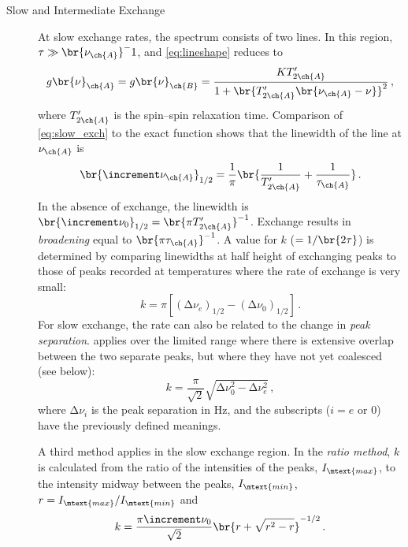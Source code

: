 \begin{description}
	\item[Slow and Intermediate Exchange] 
At slow exchange rates, the spectrum consists of two lines. 
In this region, \( \tau \gg \br{\nu_{\ch{A}}}^-1 \), and \cref{eq:lineshape} reduces to 
\begin{equation}
  g\br{\nu}_{\ch{A}} = g\br{\nu}_{\ch{B}} = \frac{K T'_{2\ch{A}}}{1 + \br{T'_{2\ch{A}} \br{\nu_{\ch{A}} - \nu}}^2} \, ,
  \label{eq:slow_exch_peak}
\end{equation}
where \( T'_{2\ch{A}} \) is the spin--spin relaxation time. 
Comparison of \cref{eq:slow_exch} to the exact function shows that the linewidth of the line at \( \nu_{\ch{A}} \) is
\begin{equation}
  \br{\increment \nu_{\ch{A}}}_{1/2} = \frac{1}{\pi} \br{\frac{1}{T'_{2\ch{A}}} + \frac{1}{\tau_{\ch{A}}}} \, .
  \label{eq:slow_exch_width}
\end{equation}
In the absence of exchange, the linewidth is \( \br{\increment \nu_0}_{1/2} = \br{\pi T'_{2\ch{A}}}^{-1} \). 
Exchange results in \emph{broadening} equal to \( \br{\pi \tau_{\ch{A}}}^{-1} \). 
A value for \( k \) (\( =1/\br{2\tau} \)) is determined by comparing linewidths at half height of exchanging peaks to those of peaks recorded at temperatures where the rate of exchange is very small:
\begin{equation}
  k = \pi [(\increment \nu_e)_{1/2} - (\increment \nu_0)_{1/2}] \, .
  \label{eq:slow_exch_k_1}
\end{equation}
For slow exchange, the rate can also be related to the change in \emph{peak separation}. 
 applies over the limited range where there is extensive overlap between the two separate peaks, but where they have not yet coalesced (see below):
\begin{equation}
  k = \frac{\pi}{\sqrt{2}} \sqrt{\increment \nu_0^2 - \increment \nu_e^2} \, ,
  \label{eq:slow_exch_k_2}
\end{equation}
where \( \increment\nu_i \) is the peak separation in \unit{\Hz}, and the subscripts (\( i = e \) or \num{0}) have the previously defined meanings.

A third method applies in the slow exchange region. 
In the \emph{ratio method}, \( k \) is calculated from the ratio of the intensities of the peaks, \( I_\mtext{max} \), to the intensity midway between the peaks, \( I_\mtext{min} \), \( r = I_\mtext{max} / I_\mtext{min} \) and 
\begin{equation}
  k = \frac{\pi \increment \nu_0}{\sqrt{2}} \br{ r + \sqrt{ r^2 - r}}^{-1/2} \, .
  \label{eq:slow_exch_k_3}
\end{equation}


\end{description}
